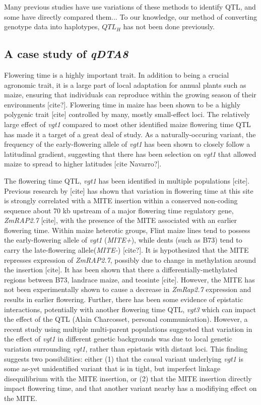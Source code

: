 \documentclass[article,9pt,twocolumn,twoside]{rilabRxiv}
\begin{document}
Many previous studies have use variations of these methods to identify QTL, and some have directly compared them... To our knowledge, our method of converting genotype data into haplotypes, $QTL_H$ has not been done previously.

\subsection{A case study of \emph{qDTA8}}
Flowering time is a highly important trait. In addition to being a crucial agronomic trait, it is a large part of local adaptation for annual plants such as maize, ensuring that individuals can reproduce within the growing season of their environments [cite?]. Flowering time in maize has been shown to be a highly polygenic trait [cite] controlled by many, mostly small-effect loci. The relatively large effect of \emph{vgt1} compared to most other identified maize flowering time QTL has made it a target of a great deal of study. As a naturally-occuring variant, the frequency of the early-flowering allele of \emph{vgt1} has been shown to closely follow a latitudinal gradient, suggesting that there has been selection on \emph{vgt1} that allowed maize to spread to higher latitudes [cite Navarro?].

The flowering time QTL, \emph{vgt1} has been identified in multiple populations [cite]. Previous research by [cite] has shown that variation in flowering time at this site is strongly correlated with a MITE insertion within a conserved non-coding sequence about 70 kb upstream of a major flowering time regulatory gene, \emph{ZmRAP2.7} [cite], with the presence of the MITE associated with an earlier flowering time. Within maize heterotic groups, Flint maize lines tend to possess the early-flowering allele of \emph{vgt1} (\emph{MITE+}), while dents (such as B73) tend to carry the late-flowering allele(\emph{MITE-}) [cite?]. It is hypothesized that the MITE represses expression of \emph{ZmRAP2.7}, possibly due to change in methylation around the insertion [cite]. It has been shown that there a differentially-methylated regions between B73, landrace maize, and teosinte [cite]. However, the MITE has not been experimentally shown to cause a decrease in \emph{ZmRap2.7} expression and results in earlier flowering. Further, there has been some evidence of epistatic interactions, potentially with another flowering time QTL, \emph{vgt3} which can impact the effect of the QTL (Alain Charcosset, personal communication). However, a recent study using multiple multi-parent populations suggested that variation in the effect of \emph{vgt1} in different genetic backgrounds was due to local genetic variation surrounding \emph{vgt1}, rather than epistasis with distant loci. This finding suggests two possibilities: either (1) that the causal variant underlying \emph{vgt1} is some as-yet unidentified variant that is in tight, but imperfect linkage disequilibrium with the MITE insertion, or (2) that the MITE insertion directly impact flowering time, and that another variant nearby has a modifiying effect on the MITE.
\end{document}
